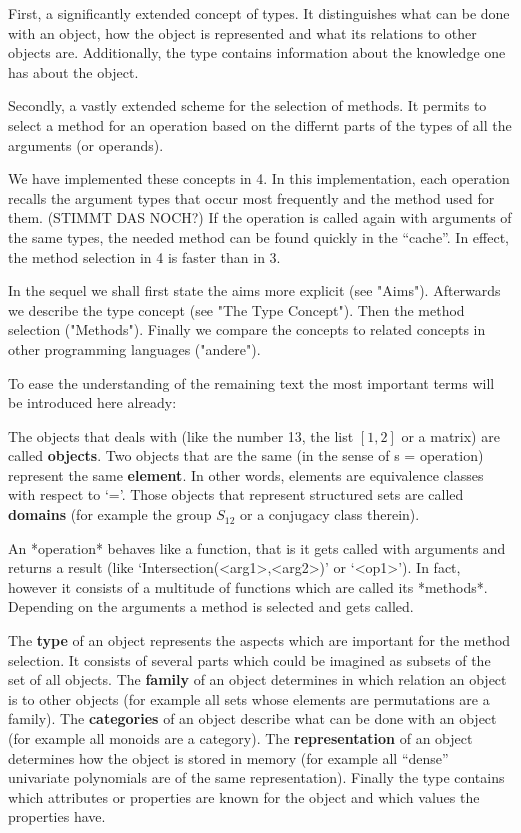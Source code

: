 First, a significantly extended concept of types. It distinguishes what can
be done with an object, how the object is represented and what its relations
to other objects are. Additionally, the type contains information about the
knowledge one has about the object.

Secondly, a vastly extended scheme for the selection of methods.
It permits to select a
method for an operation based on the differnt parts of the types of all the
arguments (or operands).

We have implemented these concepts in {\GAP} 4. In this implementation, each
operation recalls
the argument types that occur most frequently and the method used for
them. (STIMMT DAS NOCH?)  If the operation is called again with arguments of
the same types, the needed method can be found quickly in the ``cache''.
In effect, the method selection in {\GAP} 4 is faster than in {\GAP} 3.

In the sequel we shall first state the aims more explicit (see "Aims").
Afterwards we describe the type concept (see "The Type Concept"). Then
the method selection ("Methods"). Finally we compare the
concepts to related concepts in other programming languages ("andere").

To ease the understanding of the remaining text the most important terms
will be introduced here already:

The objects that {\GAP} deals with (like the number 13, the list $[1,2]$ or a
matrix) are called {\bf objects}. Two objects that are the same (in the
sense of {\GAP} s = operation) represent the same {\bf element}. In other
words, elements are equivalence classes with respect to `='. Those objects
that represent structured sets are called {\bf domains} (for example the
group $S_{12}$ or a conjugacy class therein).

An *operation* behaves like a function, that is it gets called with
arguments and returns a result (like `Intersection(<arg1>,<arg2>)'
or `<op1>'). In
fact, however it consists of a multitude of functions which are called its
*methods*. Depending on the arguments a method is selected and gets
called.

The {\bf type} of an object represents the aspects which are important for
the method selection. It consists of several parts which could be imagined
as subsets of the set of all objects. The {\bf family} of an object
determines in which relation an object is to other objects (for example all
sets whose elements are permutations are a family). The {\bf categories} of
an object describe what can be done with an object (for example all monoids
are a category). The {\bf representation} of an object determines how the
object is stored in memory (for example all ``dense'' univariate polynomials
are of the same representation). Finally the type contains which attributes
or properties are known for the object and which values the properties have.

